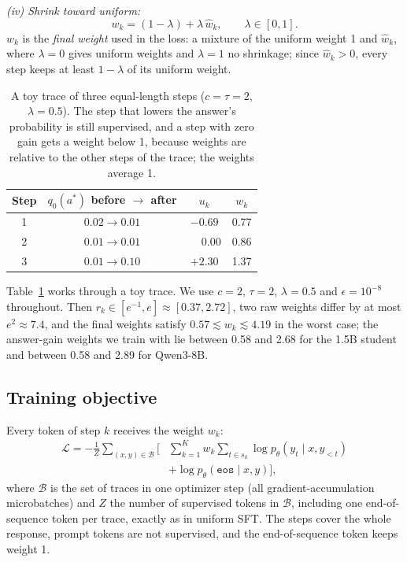 \emph{(iv) Shrink toward uniform:}
\begin{equation}
  w_k=(1-\lambda)+\lambda\,\hat w_k,\qquad \lambda\in[0,1].
  \label{eq:weights}
\end{equation}
$w_k$ is the \emph{final weight} used in the loss: a mixture of the uniform weight 1 and $\hat w_k$, where $\lambda=0$ gives uniform weights and $\lambda=1$ no shrinkage; since $\hat w_k>0$, every step keeps at least $1-\lambda$ of its uniform weight.

\begin{table}[t]
  \centering
  \small
  \setlength{\tabcolsep}{4pt}
  \begin{tabular}{cccc}
    \toprule
    Step & $q_0(a^*)$ before $\to$ after & $u_k$ & $w_k$ \\
    \midrule
    1 & $0.02\to0.01$ & $-0.69$ & 0.77 \\
    2 & $0.01\to0.01$ & $\phantom{+}0.00$ & 0.86 \\
    3 & $0.01\to0.10$ & $+2.30$ & 1.37 \\
    \bottomrule
  \end{tabular}
  \caption{A toy trace of three equal-length steps ($c=\tau=2$, $\lambda=0.5$). The step that lowers the answer's probability is still supervised, and a step with zero gain gets a weight below 1, because weights are relative to the other steps of the trace; the weights average 1.}
  \label{tab:toy}
\end{table}

Table~\ref{tab:toy} works through a toy trace.
We use $c=2$, $\tau=2$, $\lambda=0.5$ and $\epsilon=10^{-8}$ throughout.
Then $r_k\in[e^{-1},e]\approx[0.37,2.72]$, two raw weights differ by at most $e^2\approx7.4$, and the final weights satisfy $0.57\lesssim w_k\lesssim4.19$ in the worst case; the answer-gain weights we train with lie between 0.58 and 2.68 for the 1.5B student and between 0.58 and 2.89 for Qwen3-8B.

\subsection{Training objective}
\label{sec:objective}

Every token of step $k$ receives the weight $w_k$:
\begin{equation}
  \begin{split}
  \mathcal{L}=-\frac{1}{Z}\sum_{(x,y)\in\mathcal{B}}\Big[&\sum_{k=1}^{K} w_k\sum_{t\in s_k}\log p_\theta(y_t\mid x,y_{<t})\\
  &+\log p_\theta(\texttt{eos}\mid x,y)\Big],
  \end{split}
  \label{eq:loss}
\end{equation}
where $\mathcal{B}$ is the set of traces in one optimizer step (all gradient-accumulation microbatches) and $Z$ the number of supervised tokens in $\mathcal{B}$, including one end-of-sequence token per trace, exactly as in uniform SFT.
The steps cover the whole response, prompt tokens are not supervised, and the end-of-sequence token keeps weight 1.

